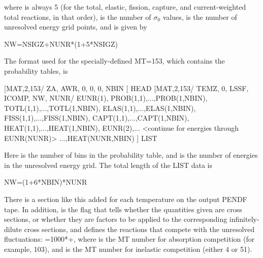 \noindent
where  is always 5 (for the total, elastic,
fission, capture, and current-weighted total reactions, in that order),
 is the number of $\sigma_0$ values,  is
the number of unresolved energy grid points, and  is
given by

\newpage
\small
\begin{ccode}

   NW=NSIGZ+NUNR*(1+5*NSIGZ)

\end{ccode}
\normalsize

The format used for the specially-defined MT=153, which contains the
probability tables, is

\small
\begin{ccode}

[MAT,2,153/ ZA, AWR, 0, 0, 0, NBIN ] HEAD
[MAT,2,153/ TEMZ, 0, LSSF, ICOMP, NW, NUNR/
            EUNR(1),
            PROB(1,1),...,PROB(1,NBIN),
            TOTL(1,1),...,TOTL(1,NBIN),
            ELAS(1,1),...,ELAS(1,NBIN),
            FISS(1,1),...,FISS(1,NBIN),
            CAPT(1,1),...,CAPT(1,NBIN),
            HEAT(1,1),...,HEAT(1,NBIN),
            EUNR(2),...
              <continue for energies through EUNR(NUNR)>
            ...,HEAT(NUNR,NBIN) ] LIST

\end{ccode}
\normalsize

\noindent
Here  is the number of bins in the probability table, and
 is the number of energies in the unresolved energy grid.
The total length of the LIST data is

\small
\begin{ccode}

  NW=(1+6*NBIN)*NUNR

\end{ccode}
\normalsize

\noindent
There is a section like this added for each temperature 
on the output PENDF tape.  In addition,  is the flag that
tells whether the quantities given are cross sections, or whether they
are factors to be applied to the corresponding infinitely-dilute cross
sections, and  defines the reactions that compete with
the unresolved fluctuations: =1000*+,
where  is the MT number for absorption competition (for
example, 103), and  is the MT number for inelastic
competition (either 4 or 51).

